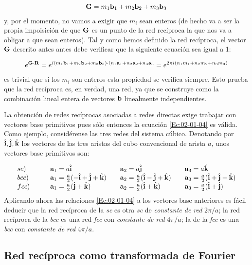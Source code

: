 \begin{equation}
	\mathbf{G} = m_1 \mathbf{b}_1 + m_2 \mathbf{b}_2 + m_3 \mathbf{b}_3
\end{equation}
y, por el momento, no vamos a exigir que $m_i$ sean enteros (de hecho va a ser la propia impoisición de que $\mathbf{G}$ es un punto de la red recíproca la que nos va a obligar a que sean enteros). Tal y como hemos definido la red recíproca, el vector $\mathbf{G}$ descrito antes antes debe verificar que la siguiente ecuación sea igual a 1:

\begin{equation*}
	e^{\mathbf{G}\cdot \mathbf{R}} = e^{i (m_1 \mathbf{b}_1 + m_2 \mathbf{b}_2 +m_3 \mathbf{b}_3)\cdot(n_1 \mathbf{a}_1 +n_2 \mathbf{a}_2 +n_3 \mathbf{a}_3}=e^{2\pi i (n_1m_1+n_2m_2+n_3m_3)}
\end{equation*}
es trivial que si los $m_i$ son enteros esta propiedad se verifica siempre. Esto prueba que la red recíproca es, en verdad, una red, ya que se construye como la combinación lineal entera de vectores $\mathbf{b}$ linealmente independientes. 

La obtención de redes recíprocas asociadas a redes directas exige trabajar con vectores base primitivos pues sólo entonces la ecuación \ref{Ec:02-01-04} es válida. Como ejemplo, considérense las tres redes del sistema cúbico. Denotando por $\hat{\mathbf{i}}, \hat{\mathbf{j}}, \hat{\mathbf{k}}$ los vectores de las tres aristas del cubo convencional de arista $a$, unos vectores base primitivos son:

\begin{equation*}
	\begin{array}{llll}
		sc) \quad &  \quad \mathbf{a}_1 = a \hat{\mathbf{i}} & \quad \mathbf{a}_2 = a \hat{\mathbf{j}} & \quad \mathbf{a}_3 = a \hat{\mathbf{k}} \\
		bcc)  \quad & \quad \mathbf{a}_1 = \frac{a}{2} (-\hat{\mathbf{i}}+\hat{\mathbf{j}}+\hat{\mathbf{k}}) & \quad \mathbf{a}_2 = \frac{a}{2} (\hat{\mathbf{i}}-\hat{\mathbf{j}}+\hat{\mathbf{k}})  & \quad \mathbf{a}_3 = \frac{a}{2} (\hat{\mathbf{i}}+\hat{\mathbf{j}}-\hat{\mathbf{k}})  \\
		fcc) \quad & \quad \mathbf{a}_1 = \frac{a}{2} (\hat{\mathbf{j}} + \hat{\mathbf{k}}) & \quad \mathbf{a}_2 = \frac{a}{2} (\hat{\mathbf{i}} + \hat{\mathbf{k}}) & \quad \mathbf{a}_3 = \frac{a}{2} (\hat{\mathbf{i}} + \hat{\mathbf{j}}) \\
	\end{array}
\end{equation*}
Aplicando ahora las relaciones \ref{Ec:02-01-04} a los vectores base anteriores es fácil deducir que la red recíproca de la \textit{sc} es otra \textit{sc} de \textit{constante de red} $2\pi/a$; la red recíproca de la \textit{bcc} es una red \textit{fcc} con \textit{constante de red} $4\pi/a$; la de la \textit{fcc} es una \textit{bcc} con \textit{constante de red} $4 \pi/a$. 

\subsection{Red recíproca como transformada de Fourier}

